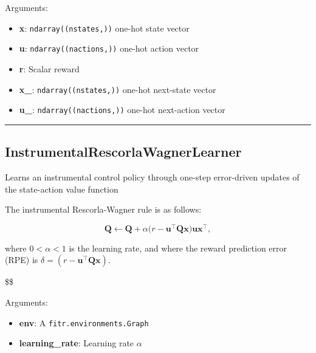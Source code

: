 Arguments:

\begin{itemize}
\tightlist
\item
  \textbf{x}: \texttt{ndarray((nstates,))} one-hot state vector
\item
  \textbf{u}: \texttt{ndarray((nactions,))} one-hot action vector
\item
  \textbf{r}: Scalar reward
\item
  \textbf{x\_}: \texttt{ndarray((nstates,))} one-hot next-state vector
\item
  \textbf{u\_}: \texttt{ndarray((nactions,))} one-hot next-action vector
\end{itemize}

\begin{center}\rule{0.5\linewidth}{\linethickness}\end{center}

\subsection{InstrumentalRescorlaWagnerLearner}\label{instrumentalrescorlawagnerlearner}

\begin{Shaded}
\begin{Highlighting}[]
\end{Highlighting}
\end{Shaded}

Learns an instrumental control policy through one-step error-driven
updates of the state-action value function

The instrumental Rescorla-Wagner rule is as follows:

\[
\mathbf Q \gets \mathbf Q + \alpha \big(r - \mathbf u^\top \mathbf Q \mathbf x \big) \mathbf u \mathbf x^\top,
\]

where \(0 < \alpha < 1\) is the learning rate, and where the reward
prediction error (RPE) is
\(\delta = (r - \mathbf u^\top \mathbf Q \mathbf x)\).

\$\$

Arguments:

\begin{itemize}
\tightlist
\item
  \textbf{env}: A \texttt{fitr.environments.Graph}
\item
  \textbf{learning\_rate}: Learning rate \(\alpha\)
\end{itemize}

